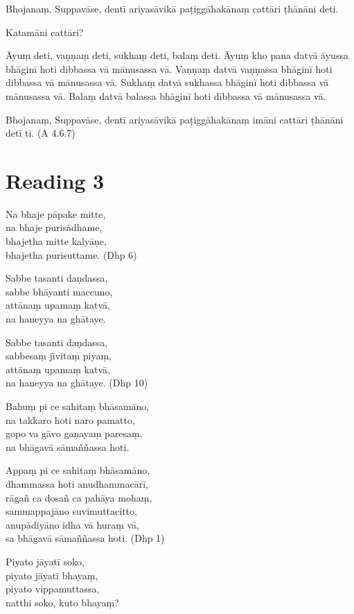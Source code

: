 Bhojanaṃ, Suppavāse, dentī ariyasāvikā paṭiggāhakānaṃ cattāri ṭhānāni deti.

Katamāni cattāri?

Āyuṃ deti, vaṇṇaṃ deti, sukhaṃ deti, balaṃ deti. Āyuṃ kho pana datvā āyussa bhāginī hoti dibbassa vā mānusassa vā. Vaṇṇaṃ datvā vaṇṇassa bhāginī hoti dibbassa vā mānusassa vā. Sukhaṃ datvā sukhassa bhāginī hoti dibbassa vā mānusassa vā. Balaṃ datvā balassa bhāginī hoti dibbassa vā mānusassa vā.

Bhojanaṃ, Suppavāse, dentī ariyasāvikā paṭiggāhakānaṃ imāni cattāri ṭhānāni detī ti. \hfill(A 4.6.7)

\section*{Reading 3}

Na bhaje pāpake mitte,\\
na bhaje purisādhame,\\
bhajetha mitte kalyāṇe,\\
bhajetha purisuttame. \hfill(Dhp 6)

Sabbe tasanti daṇdassa,\\
sabbe bhāyanti maccuno,\\
attānaṃ upamaṃ katvā,\\
na haneyya na ghātaye.

Sabbe tasanti daṇdassa,\\
sabbesaṃ jīvitaṃ piyaṃ,\\
attānaṃ upamaṃ katvā,\\
na haneyya na ghātaye. \hfill(Dhp 10)

Bahuṃ pi ce sahitaṃ bhāsamāno,\\
na takkaro hoti naro pamatto,\\
gopo va gāvo gaṇayaṃ paresaṃ,\\
na bhāgavā sāmaññassa hoti.

Appaṃ pi ce sahitaṃ bhāsamāno,\\
dhammassa hoti anudhammacārī,\\
rāgañ ca dosañ ca pahāya mohaṃ,\\
sammappajāno suvimuttacitto,\\
anupādiyāno idha vā huraṃ vā,\\
sa bhāgavā sāmaññassa hoti. \hfill(Dhp 1)

Piyato jāyatī soko,\\
piyato jāyatī bhayaṃ,\\
piyato vippamuttassa,\\
natthi soko, kuto bhayaṃ?

